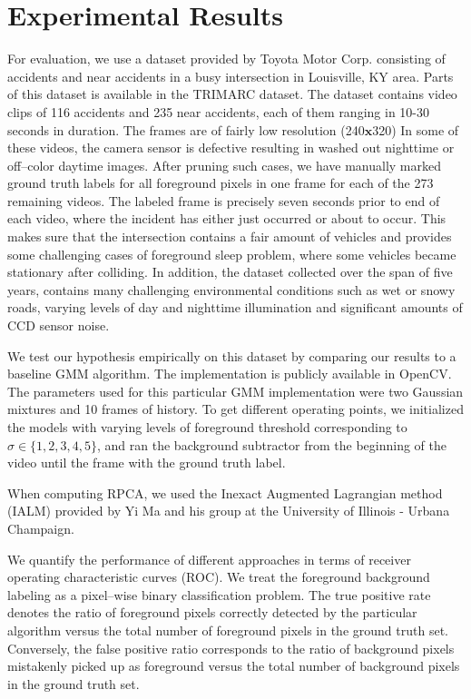 \documentclass{article}
\begin{document}
\section{Experimental Results}
For evaluation, we use a dataset provided by Toyota Motor Corp. consisting of accidents and near accidents in a busy intersection in Louisville, KY area.  Parts of this dataset is available in the TRIMARC dataset\cite{toyota_dataset}.  The dataset contains video clips of 116 accidents and 235 near accidents, each of them ranging in 10-30 seconds in duration.  The frames are of fairly low resolution (240$\mathbf{x}$320) In some of these videos, the camera sensor is defective resulting in washed out nighttime or off--color daytime images.  After pruning such cases, we have manually marked ground truth labels for all foreground pixels in one frame for each of the 273 remaining videos.  The labeled frame is precisely seven seconds prior to end of each video, where the incident has either just occurred or about to occur.  This makes sure that the intersection contains a fair amount of vehicles and provides some challenging cases of foreground sleep problem, where some vehicles became stationary after colliding.  In addition, the dataset collected over the span of five years, contains many challenging environmental conditions such as wet or snowy roads, varying levels of day and nighttime illumination and significant amounts of CCD sensor noise.

We test our hypothesis empirically on this dataset by comparing our results to a baseline GMM\cite{zivkovic2004improved} algorithm.  The implementation is publicly available in OpenCV\cite{opencv_library}.  The parameters used for this particular GMM implementation were two Gaussian mixtures and 10 frames of history.  To get different operating points, we initialized the models with varying levels of foreground threshold corresponding to $\sigma \in \{1, 2, 3, 4, 5\}$, and ran the background subtractor from the beginning of the video until the frame with the ground truth label.

When computing RPCA, we used the Inexact Augmented Lagrangian method (IALM) \cite{alm} provided by Yi Ma and his group at the University of Illinois - Urbana Champaign.

We quantify the performance of different approaches in terms of receiver operating characteristic curves (ROC).  We treat the foreground background labeling as a pixel--wise binary classification problem.  The true positive rate denotes the ratio of foreground pixels correctly detected by the particular algorithm versus the total number of foreground pixels in the ground truth set.  Conversely, the false positive ratio corresponds to the ratio of background pixels mistakenly picked up as foreground versus the total number of background pixels in the ground truth set.
\end{document}
